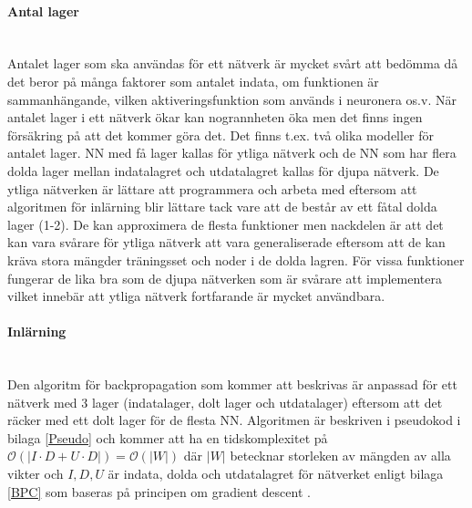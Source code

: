 \documentclass[a4paper,10pt]{article}
\begin{document}
\paragraph{Antal lager}\hspace{0pt}\\
Antalet lager som ska användas för ett nätverk är mycket svårt att bedömma då det beror på många faktorer som antalet indata, om funktionen är sammanhängande, vilken aktiveringsfunktion som används i neuronera os.v. När antalet lager i ett nätverk ökar kan nogrannheten öka men det finns ingen försäkring på att det kommer göra det. Det finns t.ex. två olika modeller för antalet lager. NN med få lager kallas för ytliga nätverk och de NN som har flera dolda lager mellan indatalagret och utdatalagret kallas för djupa nätverk\autocite{DL}. De ytliga nätverken är lättare att programmera och arbeta med eftersom att algoritmen för inlärning blir lättare tack vare att de består av ett fåtal dolda lager (1-2). De kan approximera de flesta funktioner\autocite{SLA} men nackdelen är att det kan vara svårare för ytliga nätverk att vara generaliserade eftersom att de kan kräva stora mängder träningsset och noder i de dolda lagren. För vissa funktioner fungerar de lika bra som de djupa nätverken som är svårare att implementera\autocite{SLA} vilket innebär att ytliga nätverk fortfarande är mycket användbara.  

\paragraph{Inlärning}\hspace{0pt}\\
Den algoritm för backpropagation som kommer att beskrivas är anpassad för ett nätverk med 3 lager (indatalager, dolt lager och utdatalager) eftersom att det räcker med ett dolt lager för de flesta NN.\autocite{StackExchange}\autocite{SLA}  Algoritmen är beskriven i pseudokod i bilaga \ref{Pseudo} och kommer att ha en tidskomplexitet på $\mathcal{O}(|I\cdot D+U\cdot D|) = \mathcal{O}(|W|)$ där $|W|$ betecknar storleken av mängden av alla vikter och $I,D,U$ är indata, dolda och utdatalagret för nätverket enligt bilaga \ref{BPC} som baseras på principen om gradient descent \autocite{GD}.
\end{document}
